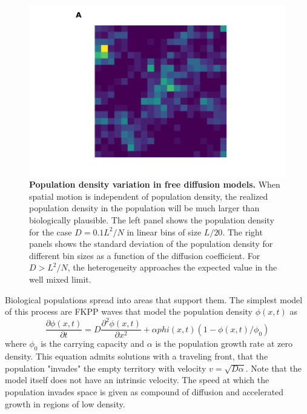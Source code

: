 \documentclass[aps,rmp, onecolumn]{revtex4}
\begin{document}
\begin{figure}
    \includegraphics*[width=\textwidth]{figures/heterogeneity_free_diffusion.pdf}
    \caption[short]{\label{fig:heterogeneity}{\bf Population density variation in free diffusion models.}
    When spatial motion is independent of population density, the realized population density in the population will be much larger than biologically plausible. The left panel shows the population density for the case $D = 0.1 L^2/N$ in linear bins of size $L/20$. The right panels shows the standard deviation of the population density for different bin sizes as a function of the diffusion coefficient. For $D>L^2/N$, the heterogeneity approaches the expected value in the well mixed limit. }
\end{figure}

Biological populations spread into areas that support them.
The simplest model of this process are FKPP waves that model the population density $\phi(x,t)$ as
\begin{equation}
    \frac{\partial \phi(x,t)}{\partial t} = D\frac{\partial^2 \phi(x,t)}{\partial x^2} + \alpha phi(x,t)(1-\phi(x,t)/\phi_0)
\end{equation}
where $\phi_0$ is the carrying capacity and $\alpha$ is the population growth rate at zero density.
This equation admits solutions with a traveling front, that the population "invades" the empty territory with velocity $v = \sqrt{D \alpha}$.
Note that the model itself does not have an intrinsic velocity.
The speed at which the population invades space is given as compound of diffusion and accelerated growth in regions of low density.
\end{document}
